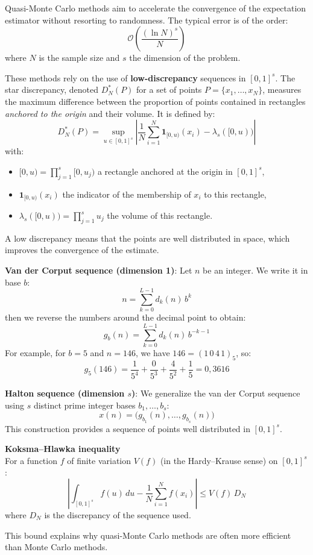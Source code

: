 %
\begin{f}
	
	Quasi-Monte Carlo methods aim to accelerate the convergence of the expectation estimator without resorting to randomness. The typical error is of the order:
	\[
	\mathcal{O}\left( \frac{(\ln N)^s}{N} \right)
	\]
	where \(N\) is the sample size and \(s\) the dimension of the problem.
	
	These methods rely on the use of \textbf{low-discrepancy} sequences in \([0,1]^s\). The star discrepancy, denoted \(D^*_N(P)\) for a set of points \(P = \{x_1, \ldots, x_N\}\), measures the maximum difference between the proportion of points contained in rectangles \emph{anchored to the origin} and their volume. It is defined by:
	\[
	D^*_N(P) = \sup_{u \in [0,1]^s} \left| \frac{1}{N} \sum_{i=1}^N \mathbf{1}_{[0,u)}(x_i) - \lambda_s([0,u)) \right|
	\]
	with:
	\begin{itemize}
		\item \([0,u) = \prod_{j=1}^s [0, u_j)\) a rectangle anchored at the origin in \([0,1]^s\),
		\item \(\mathbf{1}_{[0,u)}(x_i)\) the indicator of the membership of \(x_i\) to this rectangle,
		\item \(\lambda_s([0,u)) = \prod_{j=1}^s u_j\) the volume of this rectangle.
	\end{itemize}
	A low discrepancy means that the points are well distributed in space, which improves the convergence of the estimate.
	
	\medskip
	\textbf{Van der Corput sequence (dimension 1)}:
	Let \(n\) be an integer. We write it in base \(b\):
	\[
	n = \sum_{k=0}^{L-1} d_k(n)\, b^k
	\]
	then we reverse the numbers around the decimal point to obtain:
	\[
	g_b(n) = \sum_{k=0}^{L-1} d_k(n)\, b^{-k-1}
	\]
	For example, for \(b = 5\) and \(n = 146\), we have \(146 = (1\,0\,4\,1)_5\), so:
	\[
	g_5(146) = \frac{1}{5^4} + \frac{0}{5^3} + \frac{4}{5^2} + \frac{1}{5} = 0{,}3616
	\]
	
	\medskip
	\textbf{Halton sequence (dimension \(s\))}:
	We generalize the van der Corput sequence using \(s\) distinct prime integer bases \(b_1, \dots, b_s\):
	\[
	x(n) = \big( g_{b_1}(n), \dots, g_{b_s}(n) \big)
	\]
	This construction provides a sequence of points well distributed in \([0,1]^s\).
	
	\medskip
	\textbf{Koksma–Hlawka inequality}\\
	For a function \(f\) of finite variation \(V(f)\) (in the Hardy–Krause sense) on \([0,1]^s\):
	\[
	\left| \int_{[0,1]^s} f(u)\, du - \frac{1}{N} \sum_{i=1}^N f(x_i) \right| \leq V(f)\, D_N
	\]
	where \(D_N\) is the discrepancy of the sequence used.
	
This bound explains why quasi-Monte Carlo methods are often more efficient than Monte Carlo methods.
	
	
\end{f}
